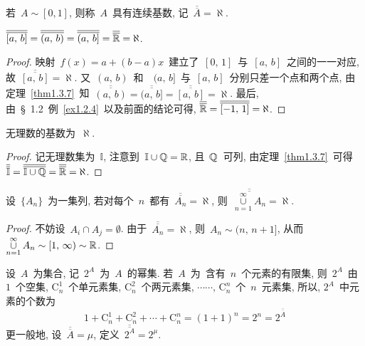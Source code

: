 \begin{definition}
若~$A \sim [0,1]$, 则称~$A$~具有连续基数, 记~$\overline{\overline{A}} = \aleph$.
\end{definition}

\begin{theorem}
$\overline{\overline{[a,\,b]}} = \overline{\overline{(a,\,b)}} = \overline{\overline{(a,\,b]}} = \overline{\overline{\mathbb{R}}} = \aleph$.
\end{theorem}

\begin{proof}
映射~$f(x) = a + (b - a)x$~建立了~$[0,\,1]$~与~$[a,\,b]$~之间的一一对应, 故~$\overline{\overline{[a,\,b]}} = \aleph$. 又~$(a,\,b)$~和~~$(a,\,b]$~与~$[a,\,b]$~分别只差一个点和两个点, 由定理~\ref{thm1.3.7}~知~$
\overline{\overline{(a,\,b)}} = \overline{\overline{(a,\,b]}} = \overline{\overline{[a,\,b]}} = \aleph$.
最后, 由~\S~1.2~例~\ref{ex1.2.4}~以及前面的结论可得, $\overline{\overline{\mathbb{R}}} = \overline{\overline{[-1,\,1]}} = \aleph$.
\end{proof}

\begin{corollary}
无理数的基数为~$\aleph$.
\end{corollary}

\begin{proof}
记无理数集为~$\mathbb{I}$, 注意到~$\mathbb{I} \cup \mathbb{Q} = \mathbb{R}$, 且~$\mathbb{Q}$~可列, 由定理~\ref{thm1.3.7}~可得~$\overline{\overline{\mathbb{I}}} = \overline{\overline{\mathbb{I} \cup \mathbb{Q}}} = \overline{\overline{\mathbb{R}}} = \aleph$.
\end{proof}

\begin{theorem}
设~$\{A_n\}$~为一集列, 若对每个~$n$~都有~$\overline{\overline{A_n}} = \aleph$, 则~$\overline{\overline{\mathop{\cup}\limits_{n=1}^\infty A_n}} = \aleph$.
\end{theorem}

\begin{proof}
不妨设~$A_i \cap A_j = \emptyset$. 由于~$\overline{\overline{A_n}} = \aleph$, 则~$A_n \sim (n,\,n+1]$, 从而~$\mathop{\cup}\limits_{n=1}^\infty A_n \sim [1,\,\infty) \sim \mathbb{R}$.
\end{proof}

设~$A$~为集合, 记~$2^A$~为~$A$~的幂集. 若~$A$~为~含有~$n$~个元素的有限集, 则~$2^A$~由~$1$~个空集,
$\mathrm{C}_n ^1$~个单元素集, $\mathrm{C}_n ^2$~个两元素集, $\cdots\cdots,\, \mathrm{C}_n^n$~个~$n$~元素集,  所以, $2^A$~中元素的个数为
\[
1 + \mathrm{C}_n ^1 + \mathrm{C}_n ^2 + \cdots + \mathrm{C}_n ^n = (1 + 1)^n = 2^n = 2^{\overline{\overline{A}}}
\]
更一般地, 设~$\overline{\overline{A}} = \mu$, 定义~$\overline{\overline{2^A}} = 2^\mu$.

